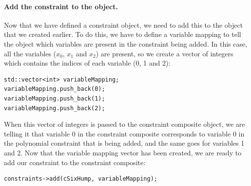 \paragraph{Add the constraint to the  object.} Now that we have defined a constraint object, we need to add this to the  object that we created earlier. To do this, we have to define a variable mapping to tell the  object which variables are present in the constraint being added. In this case, all the variables ($x_0$, $x_1$ and $x_2$) are present, so we create a vector of integers which contains the indices of each variable (0, 1 and 2):
\begin{lstlisting}
std::vector<int> variableMapping;
variableMapping.push_back(0);
variableMapping.push_back(1);
variableMapping.push_back(2);
\end{lstlisting}
When this vector of integers is passed to the constraint composite object, we are telling it that variable 0 in the constraint composite corresponds to variable 0 in the polynomial constraint that is being added, and the same goes for variables 1 and 2. Now that the variable mapping vector has been created, we are ready to add our constraint to the constraint composite:
\begin{lstlisting}
constraints->add(cSixHump, variableMapping);
\end{lstlisting}

